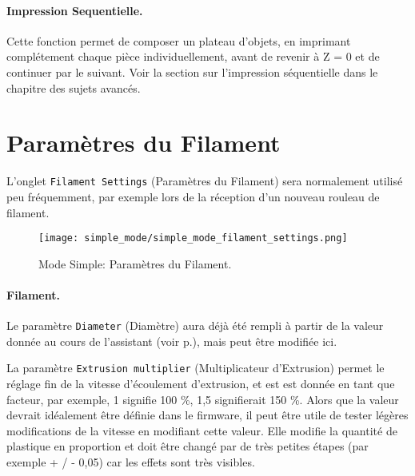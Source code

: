 
\paragraph{Impression Sequentielle.} %
\label{par:sequential_printing}
Cette fonction permet de composer un plateau d'objets, en imprimant compl\'etement chaque pi\`ece individuellement, avant de revenir \`a Z = 0 et de continuer par le suivant. Voir la section sur l'impression s\'equentielle dans le chapitre des sujets avanc\'es.


\section{Param\`etres du Filament}
L'onglet \texttt{Filament Settings} (Param\`etres du Filament) sera normalement utilis\'e peu fr\'equemment, par exemple lors de la r\'eception d'un nouveau rouleau de filament.

\begin{figure}[H]
\centering
\texttt{[image: simple\_mode/simple\_mode\_filament\_settings.png]}
\caption{Mode Simple: Param\`etres du Filament.}
\label{fig:simple_mode_filament_settings}
\end{figure}

\paragraph{Filament.} %
\label{par:filament}
Le param\`etre \texttt{Diameter} (Diam\`etre) aura d\'ej\`a \'et\'e rempli \`a partir de la valeur donn\'ee au cours de l'assistant (voir p.\pageref{sub:4_filament_diameter}), mais peut \^etre modifi\'ee ici.

La param\`etre \texttt{Extrusion multiplier} (Multiplicateur d'Extrusion) permet le r\'eglage fin de la vitesse d'\'ecoulement d'extrusion, et est est donn\'ee en tant que facteur, par exemple, 1 signifie 100 \%, 1,5 signifierait 150 \%. Alors que la valeur devrait id\'ealement \^etre d\'efinie dans le firmware, il peut \^etre utile de tester l\'eg\`eres modifications de la vitesse en modifiant cette valeur. Elle modifie la quantit\'e de plastique en proportion et doit \^etre chang\'e par de tr\`es petites \'etapes (par exemple + / - 0,05) car les effets sont tr\`es visibles.

